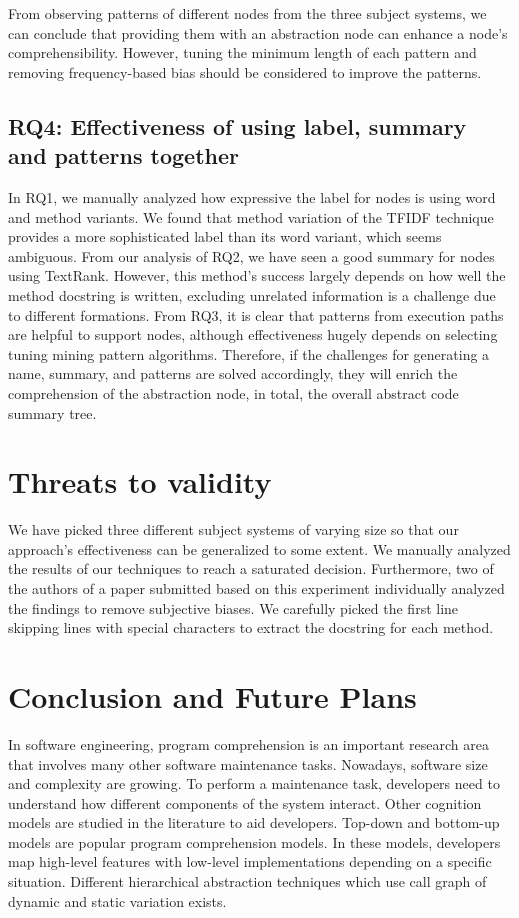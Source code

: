 From observing patterns of different nodes from the three subject systems, we can conclude that providing them with an abstraction node can enhance a node's comprehensibility. However, tuning the minimum length of each pattern and removing frequency-based bias should be considered to improve the patterns.
\subsection{ RQ4: Effectiveness of using label, summary and patterns together}

In RQ1, we manually analyzed how expressive the label for nodes is using word and method variants. We found that method variation of the TFIDF technique provides a more sophisticated label than its word variant, which seems ambiguous. From our analysis of RQ2, we have seen a good summary for nodes using TextRank. However, this method's success largely depends on how well the method docstring is written, excluding unrelated information is a challenge due to different formations. From RQ3, it is clear that patterns from execution paths are helpful to support nodes, although effectiveness hugely depends on selecting tuning mining pattern algorithms. Therefore, if the challenges for generating a name, summary, and patterns are solved accordingly, they will enrich the comprehension of the abstraction node, in total, the overall abstract code summary tree. 

\section{Threats to validity}

We have picked three different subject systems of varying size so that our approach's effectiveness can be generalized to some extent. We manually analyzed the results of our techniques to reach a saturated decision. Furthermore, two of the authors of a paper submitted based on this experiment individually analyzed the findings to remove subjective biases. We carefully picked the first line skipping lines with special characters to extract the docstring for each method. 

\section{Conclusion and Future Plans}
In software engineering, program comprehension is an important research area that involves many other software maintenance tasks. Nowadays, software size and complexity are growing. To perform a maintenance task, developers need to understand how different components of the system interact. Other cognition models are studied in the literature to aid developers. Top-down and bottom-up models are popular program comprehension models. In these models, developers map high-level features with low-level implementations depending on a specific situation. Different hierarchical abstraction techniques which use call graph of dynamic and static variation exists. 

